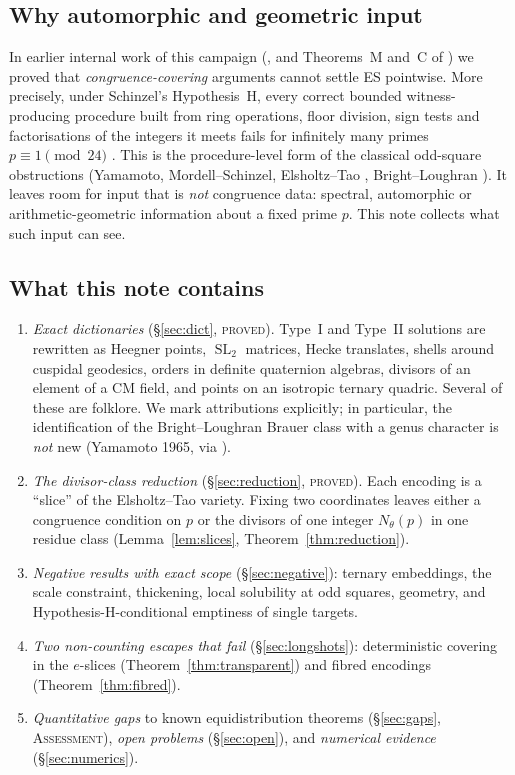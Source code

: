 \documentclass[10pt,reqno]{amsart}
\theoremstyle{definition}
\numberwithin{equation}{section}
\DeclareMathOperator{\SL}{SL}
\newcommand{\status}[1]{\textup{\textsc{#1}}}
\begin{document}
\subsection*{Why automorphic and geometric input}
In earlier internal work of this campaign
(\cite{PO}, and Theorems~M and~C of \cite{PS}) we proved that
\emph{congruence-covering} arguments cannot settle ES pointwise. More
precisely, under Schinzel's Hypothesis~H, every correct bounded
witness-producing procedure built from ring operations, floor division,
sign tests and factorisations of the integers it meets fails for
infinitely many primes $p\equiv1\pmod{24}$ \cite[Thm~C]{PS}. This is the
procedure-level form of the classical odd-square obstructions (Yamamoto,
Mordell--Schinzel, Elsholtz--Tao \cite[Prop.~1.6]{ET}, Bright--Loughran
\cite[Cor.~1.4]{BL}). It leaves room for input that is \emph{not}
congruence data: spectral, automorphic or arithmetic-geometric
information about a fixed prime $p$. This note collects what such input
can see.

\subsection*{What this note contains}
\begin{enumerate}
\item \emph{Exact dictionaries} (\S\ref{sec:dict}, \status{proved}). Type~I
and Type~II solutions are rewritten as Heegner points, $\SL_2$ matrices,
Hecke translates, shells around cuspidal geodesics, orders in definite
quaternion algebras, divisors of an element of a CM field, and points on
an isotropic ternary quadric. Several of these are folklore. We mark
attributions explicitly; in particular, the identification of the
Bright--Loughran Brauer class with a genus character is \emph{not} new
(Yamamoto 1965, via \cite[App.~A]{BL}).
\item \emph{The divisor-class reduction} (\S\ref{sec:reduction},
\status{proved}). Each encoding is a ``slice'' of the Elsholtz--Tao
variety. Fixing two coordinates leaves either a congruence condition on
$p$ or the divisors of one integer $N_\theta(p)$ in one residue class
(Lemma~\ref{lem:slices}, Theorem~\ref{thm:reduction}).
\item \emph{Negative results with exact scope} (\S\ref{sec:negative}):
ternary embeddings, the scale constraint, thickening, local solubility at
odd squares, geometry, and Hypothesis-H-conditional emptiness of single
targets.
\item \emph{Two non-counting escapes that fail} (\S\ref{sec:longshots}):
deterministic covering in the $e$-slices (Theorem~\ref{thm:transparent})
and fibred encodings (Theorem~\ref{thm:fibred}).
\item \emph{Quantitative gaps} to known equidistribution theorems
(\S\ref{sec:gaps}, \status{Assessment}), \emph{open problems}
(\S\ref{sec:open}), and \emph{numerical evidence} (\S\ref{sec:numerics}).
\end{enumerate}
\end{document}
